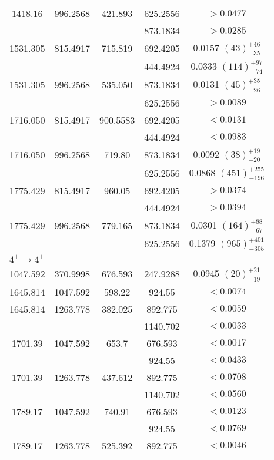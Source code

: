 \begin{portrait}
\begin{longtable}{c|c|c|c|c}
        1418.16 & 996.2568 & 421.893 & 625.2556 & $>0.0477$  \\ 
        &  &  & 873.1834 & $>0.0285$  \\ \hline
        1531.305 & 815.4917 & 715.819 &  692.4205 & 0.0157 $(43)_{-35}^{+46}$  \\
        &  &  & 444.4924 & 0.0333 $(114)_{-74}^{+97}$ \\ \hline
        1531.305 & 996.2568 & 535.050 & 873.1834 & 0.0131 $(45)_{-26}^{+35}$  \\ 
        &  &  & 625.2556 & $>0.0089$  \\ \hline
        1716.050 & 815.4917 & 900.5583 &  692.4205 & $<0.0131$  \\ 
        &  &  & 444.4924 & $<0.0983$   \\ \hline
        1716.050 & 996.2568 & 719.80 & 873.1834 & 0.0092 $(38)_{-20}^{+19}$  \\ 
        &  &  & 625.2556 & 0.0868 $(451)_{-196}^{+255}$  \\ \hline
        1775.429 & 815.4917 & 960.05 &  692.4205 & $>0.0374$   \\
        &  &  & 444.4924 & $>0.0394$  \\ \hline
        1775.429 & 996.2568 & 779.165 & 873.1834 & 0.0301 $(164)_{-67}^{+88}$  \\
        &  &  & 625.2556 & 0.1379 $(965)_{-305}^{+401}$  \\ \hline
        \multicolumn{5}{l}{$4^+\rightarrow 4^+$} 	\\ \hline
        1047.592 & 370.9998 & 676.593 & 247.9288 & 0.0945 $(20)_{-19}^{+21}$ \\ \hline
        1645.814 & 1047.592 & 598.22 & 924.55 &  $<0.0074$  \\ \hline
        1645.814 & 1263.778 & 382.025 & 892.775 & $<0.0059$  \\
         &  &  & 1140.702 & $<0.0033$  \\ \hline
        1701.39 & 1047.592 & 653.7 & 676.593 & $<0.0017$   \\
        &  &  & 924.55 & $<0.0433$  \\ \hline
        1701.39 & 1263.778 & 437.612 & 892.775 & $<0.0708$ \\
        &  &  & 1140.702 & $<0.0560$    \\ \hline
        1789.17 & 1047.592 & 740.91 & 676.593 & $<0.0123$  \\
        &  &  & 924.55 & $<0.0769$  \\ \hline
        1789.17 & 1263.778 & 525.392 & 892.775 & $<0.0046$  \\

\end{longtable}
\end{portrait}
